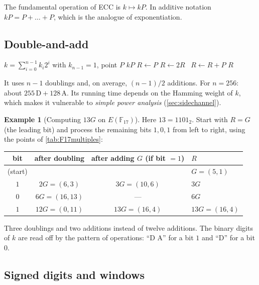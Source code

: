 \documentclass[11pt,a4paper,oneside]{book}
\theoremstyle{plain}
\theoremstyle{definition}
\newtheorem{example}[theorem]{Example}
\theoremstyle{remark}
\newcommand{\F}{\mathbb{F}}
\begin{document}
The fundamental operation of ECC is $k\mapsto kP$. In additive notation $kP=P+\dots+P$, which is the analogue of exponentiation.

\subsection{Double-and-add}

\begin{algorithm}[ht]
\caption{Left-to-right double-and-add}\label{alg:dbl-add}
\begin{algorithmic}[1]
\Require $k=\sum_{i=0}^{n-1}k_i2^i$ with $k_{n-1}=1$, point $P$
\Ensure $kP$
\State $R\gets P$
  \State $R\gets 2R$
  \ $R\gets R+P$\EndIf
\EndFor
\State \Return $R$
\end{algorithmic}
\end{algorithm}

It uses $n-1$ doublings and, on average, $(n-1)/2$ additions. For $n=256$: about $255\,\mathrm{D}+128\,\mathrm{A}$.
Its running time depends on the Hamming weight of $k$, which makes it vulnerable to \emph{simple power analysis} (\cref{sec:sidechannel}).

\begin{example}[Computing $13G$ on $E(\F_{17})$]\label{ex:dbl-add}
Here $13=1101_2$. Start with $R=G$ (the leading bit) and process the remaining bits $1,0,1$ from left to right, using the points of \cref{tab:F17multiples}:
\begin{center}
\small
\begin{tabular}{@{}cccl@{}}
\toprule
bit & after doubling & after adding $G$ (if bit $=1$) & $R$\\
\midrule
(start) & & & $G=(5,1)$\\
$1$ & $2G=(6,3)$ & $3G=(10,6)$ & $3G$\\
$0$ & $6G=(16,13)$ & --- & $6G$\\
$1$ & $12G=(0,11)$ & $13G=(16,4)$ & $13G=(16,4)$\\
\bottomrule
\end{tabular}
\end{center}
Three doublings and two additions instead of twelve additions. The binary digits of $k$ are read off by the pattern of operations: ``D A'' for a bit $1$ and ``D'' for a bit $0$.
\end{example}

\subsection{Signed digits and windows}
\end{document}
